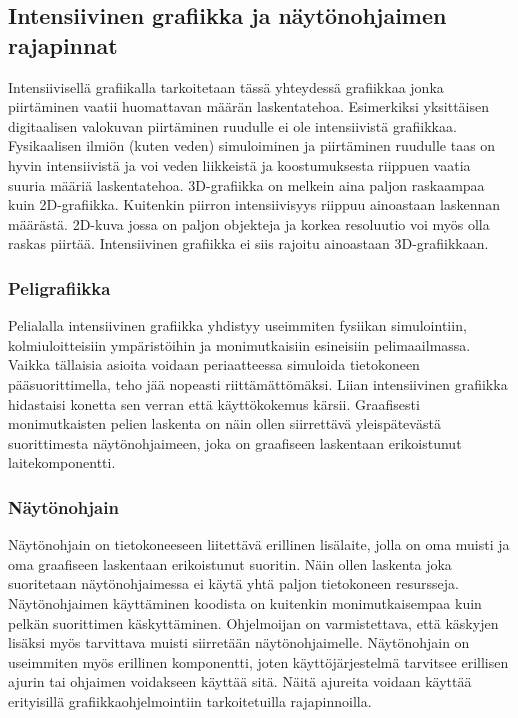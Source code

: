 \subsection{Intensiivinen grafiikka ja näytönohjaimen rajapinnat}
Intensiivisellä grafiikalla tarkoitetaan tässä yhteydessä grafiikkaa jonka piirtäminen vaatii huomattavan määrän laskentatehoa. Esimerkiksi yksittäisen digitaalisen valokuvan piirtäminen ruudulle ei ole intensiivistä grafiikkaa. Fysikaalisen ilmiön (kuten veden) simuloiminen ja piirtäminen ruudulle taas on hyvin intensiivistä ja voi veden liikkeistä ja koostumuksesta riippuen vaatia suuria määriä laskentatehoa. 3D-grafiikka on melkein aina paljon raskaampaa kuin 2D-grafiikka. Kuitenkin piirron intensiivisyys riippuu ainoastaan laskennan määrästä. 2D-kuva jossa on paljon objekteja ja korkea resoluutio voi myös olla raskas piirtää. Intensiivinen grafiikka ei siis rajoitu ainoastaan 3D-grafiikkaan.

\subsubsection{Peligrafiikka}
Pelialalla intensiivinen grafiikka yhdistyy useimmiten fysiikan simulointiin, kolmiuloitteisiin ympäristöihin ja monimutkaisiin esineisiin pelimaailmassa. Vaikka tällaisia asioita voidaan periaatteessa simuloida tietokoneen pääsuorittimella, teho jää nopeasti riittämättömäksi. Liian intensiivinen grafiikka hidastaisi konetta sen verran että käyttökokemus kärsii. Graafisesti monimutkaisten pelien laskenta on näin ollen siirrettävä yleispätevästä suorittimesta näytönohjaimeen, joka on graafiseen laskentaan erikoistunut laitekomponentti.

\subsubsection{Näytönohjain}
Näytönohjain on tietokoneeseen liitettävä erillinen lisälaite, jolla on oma muisti ja oma graafiseen laskentaan erikoistunut suoritin. Näin ollen laskenta joka suoritetaan näytönohjaimessa ei käytä yhtä paljon tietokoneen resursseja. Näytönohjaimen käyttäminen koodista on kuitenkin monimutkaisempaa kuin pelkän suorittimen käskyttäminen. Ohjelmoijan on varmistettava, että käskyjen lisäksi myös tarvittava muisti siirretään näytönohjaimelle. Näytönohjain on useimmiten myös erillinen komponentti, joten käyttöjärjestelmä tarvitsee erillisen ajurin tai ohjaimen voidakseen käyttää sitä. Näitä ajureita voidaan käyttää erityisillä grafiikkaohjelmointiin tarkoitetuilla rajapinnoilla.

